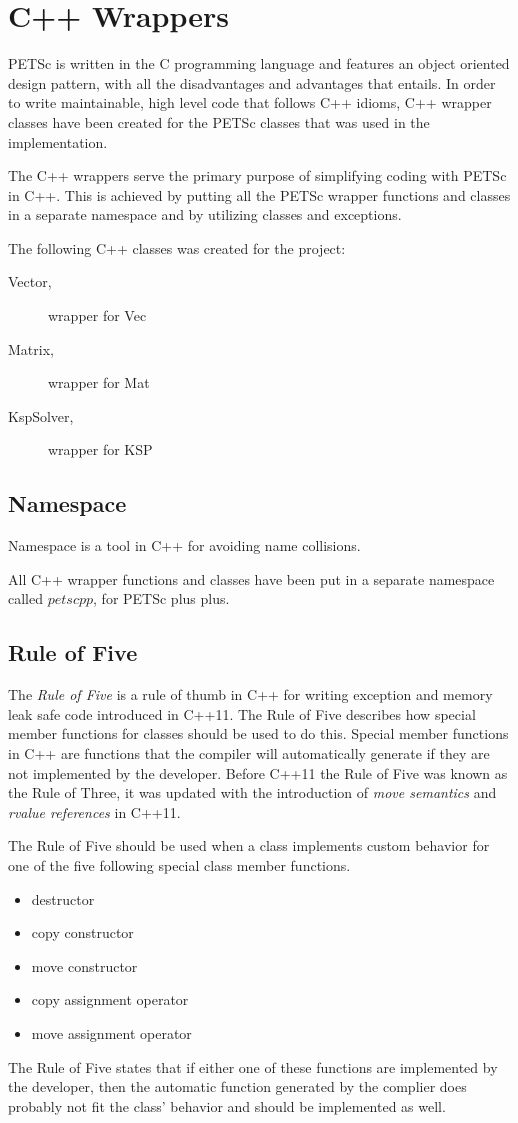 \section{C++ Wrappers}

PETSc is written in the C programming language and features an object oriented
design pattern, with all the disadvantages and advantages that entails. In order
to write maintainable, high level code that follows C++ idioms, C++ wrapper
classes have been created for the PETSc classes that was used in the
implementation.

The C++ wrappers serve the primary purpose of simplifying coding with PETSc in
C++. This is achieved by putting all the PETSc wrapper functions and classes in
a separate namespace and by utilizing classes and exceptions.

The following C++ classes was created for the project:
\begin{description}
	\item[Vector,] wrapper for Vec
	\item[Matrix,] wrapper for Mat
	\item[KspSolver,] wrapper for KSP
\end{description}

\subsection{Namespace}

Namespace is a tool in C++ for avoiding name collisions.

All C++ wrapper functions and classes have been put in a separate namespace
called $petscpp$, for PETSc plus plus.

\subsection{Rule of Five}

The \emph{Rule of Five} is a rule of thumb in C++ for writing exception and
memory leak safe code introduced in C++11. The Rule of Five describes how 
special member functions for classes should be used to do this. Special member
functions in C++ are functions that the compiler will automatically generate if
they are not implemented by the developer. Before C++11 the Rule of Five was
known as the Rule of Three, it was updated with the introduction of \emph{move
semantics} and \emph{rvalue references} in C++11.

The Rule of Five should be used when a class implements custom behavior for one
of the five following special class member functions.
\begin{itemize}
	\item destructor
	\item copy constructor
	\item move constructor
	\item copy assignment operator
	\item move assignment operator
\end{itemize}
The Rule of Five states that if either one of these functions are implemented by
the developer, then the automatic function generated by the complier does
probably not fit the class' behavior and should be implemented as well.


